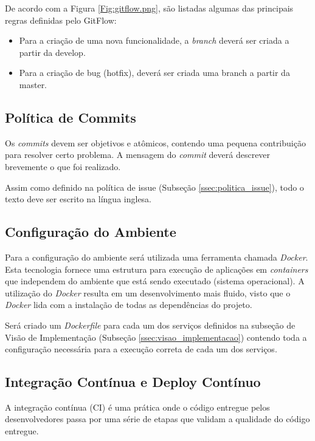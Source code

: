 {De acordo com a Figura \ref{Fig:gitflow.png}, são listadas algumas das principais regras definidas pelo GitFlow:

\begin{itemize}
    \item Para a criação de uma nova funcionalidade, a \textit{branch} deverá ser criada a partir da develop.
    \item Para a criação de bug (hotfix), deverá ser criada uma branch a partir da master.
\end{itemize}

\subsection{Política de Commits}

Os \textit{commits} devem ser objetivos e atômicos, contendo uma pequena contribuição para resolver certo problema. A mensagem do \textit{commit} deverá descrever brevemente o que foi realizado.

Assim como definido na política de issue (Subseção \ref{ssec:politica_issue}), todo o texto deve ser escrito na língua inglesa.

\subsection{Configuração do Ambiente}
\label{ssec:config_amb}

Para a configuração do ambiente será utilizada uma ferramenta chamada \textit{Docker}. Esta tecnologia fornece uma estrutura para execução de aplicações em \textit{containers} que independem do ambiente que está sendo executado (sistema operacional). A utilização do \textit{Docker} resulta em um desenvolvimento mais fluido, visto que o \textit{Docker} lida com a instalação de todas as dependências do projeto.

Será criado um \textit{Dockerfile} para cada um dos serviços definidos na subseção de Visão de Implementação (Subseção \ref{ssec:visao_implementacao}) contendo toda a configuração necessária para a execução correta de cada um dos serviços.

\subsection{Integração Contínua e Deploy Contínuo}
\label{ssec:ci_cd}

A integração contínua (CI) é uma prática onde o código entregue pelos desenvolvedores passa por uma série de etapas que validam a qualidade do código entregue.

}
